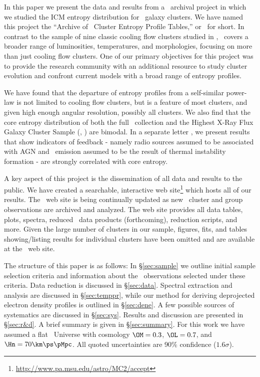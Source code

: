 \documentclass[apj]{emulateapj}
\begin{document}
In this paper we present the data and results from a \chandra\
archival project in which we studied the ICM entropy distribution for
\numcluster\ galaxy clusters. We have named this project the ``Archive
of \chandra\ Cluster Entropy Profile Tables,'' or \accept\ for
short. In contrast to the sample of nine classic cooling flow clusters
studied in \citet[][hereafter D06]{d06}, \accept\ covers a broader range
of luminosities, temperatures, and morphologies, focusing on more than
just cooling flow clusters. One of our primary objectives for this
project was to provide the research community with an additional
resource to study cluster evolution and confront current models with a
broad range of entropy profiles.

We have found that the departure of entropy profiles from a
self-similar power-law is not limited to cooling flow clusters, but is
a feature of most clusters, and given high enough angular resolution,
possibly all clusters. We also find that the core entropy distribution
of both the full \accept\ collection and the Highest X-Ray Flux Galaxy
Cluster Sample (\hifl, \citealt{hiflugcs1, hiflugcs2}) are bimodal. In
a separate letter \citep{haradent}, we present results that show
indicators of feedback - namely radio sources assumed to be associated
with AGN and \halpha\ emission assumed to be the result of thermal
instability formation - are strongly correlated with core entropy.

A key aspect of this project is the dissemination of all data and
results to the public. We have created a searchable, interactive web
site\footnote{\url{http://www.pa.msu.edu/astro/MC2/accept}} which
hosts all of our results. The \accept\ web site is being continually
updated as new \chandra\ cluster and group observations are archived
and analyzed. The web site provides all data tables, plots, spectra,
reduced \chandra\ data products (forthcoming), reduction scripts, and
more. Given the large number of clusters in our sample, figures, fits,
and tables showing/listing results for individual clusters have been
omitted and are available at the
\accept\ web site.

The structure of this paper is as follows: In \S\ref{sec:sample} we
outline initial sample selection criteria and information about the
\chandra\ observations selected under these criteria. Data reduction
is discussed in \S\ref{sec:data}. Spectral extraction and analysis are
discussed in \S\ref{sec:temppr}, while our method for deriving
deprojected electron density profiles is outlined in
\S\ref{sec:dene}. A few possible sources of systematics are discussed
in \S\ref{sec:sys}. Results and discussion are presented in
\S\ref{sec:r&d}. A brief summary is given in \S\ref{sec:summary}. For
this work we have assumed a flat \LCDM\ Universe with cosmology
$\OM=0.3$, $\OL=0.7$, and $\Hn=70\km\ps\pMpc$. All quoted
uncertainties are 90\% confidence ($1.6\sigma$).
\end{document}
